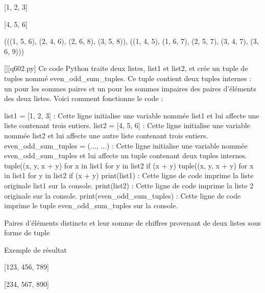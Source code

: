 [1, 2, 3]

[4, 5, 6]

(((1, 5, 6), (2, 4, 6), (2, 6, 8), (3, 5, 8)), ((1, 4, 5), (1, 6, 7), (2, 5, 7), (3, 4, 7), (3, 6, 9)))
        \par
        \begin{solution}
            \renewcommand{\nomfichier}{q602.py}
            \pythonfile{\chemincode \nomfichier}[][\nomfichier]
            Ce code Python traite deux listes, list1 et list2, et crée un tuple de tuples nommé even_odd_sum_tuples. Ce tuple contient deux tuples internes : un pour les sommes paires et un pour les sommes impaires des paires d'éléments des deux listes. Voici comment fonctionne le code :

    list1 = [1, 2, 3] : Cette ligne initialise une variable nommée list1 et lui affecte une liste contenant trois entiers.
    list2 = [4, 5, 6] : Cette ligne initialise une variable nommée list2 et lui affecte une autre liste contenant trois entiers.
    even_odd_sum_tuples = (..., ...) : Cette ligne initialise une variable nommée even_odd_sum_tuples et lui affecte un tuple contenant deux tuples internes.
        tuple((x, y, x + y) for x in list1 for y in list2 if (x + y) %
        tuple((x, y, x + y) for x in list1 for y in list2 if (x + y) %
    print(list1) : Cette ligne de code imprime la liste originale list1 sur la console.
    print(list2) : Cette ligne de code imprime la liste 2 originale sur la console.
    print(even_odd_sum_tuples) : Cette ligne de code imprime le tuple even_odd_sum_tuples sur la console.
        \end{solution}
        

        \question
        Paires d'éléments distincts et leur somme de chiffres provenant de deux listes sous forme de tuple

Exemple de résultat

[123, 456, 789]

[234, 567, 890]

